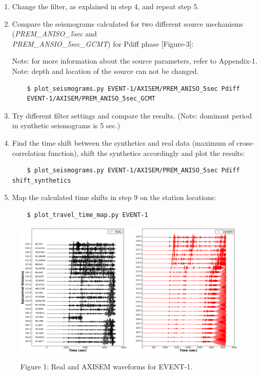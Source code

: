 \documentclass{article}
\begin{document}
\begin{enumerate}
    \item Change the filter, as explained in step 4, and repeat step 5.

    \item Compare the seismograms calculated for two different source
    mechanisms (\textit{PREM\_ANISO\_5sec} and \\
    \textit{PREM\_ANSIO\_5sec\_GCMT}) for Pdiff phase [Figure-3]:

    Note: for more information about the source parameters, refer to Appendix-1.\\
    Note: depth and location of the source can not be changed.
    \begin{verbatim}
    $ plot_seismograms.py EVENT-1/AXISEM/PREM_ANISO_5sec Pdiff
    EVENT-1/AXISEM/PREM_ANISO_5sec_GCMT
    \end{verbatim}

    \item Try different filter settings and compare the results.
    (Note: dominant period in synthetic seismograms is 5 sec.)

    \item Find the time shift between the synthetics and real data (maximum of
    cross-correlation function), shift the synthetics accordingly and plot the results:

    \begin{verbatim}
    $ plot_seismograms.py EVENT-1/AXISEM/PREM_ANISO_5sec Pdiff shift_synthetics
    \end{verbatim}

    \item Map the calculated time shifts in step 9 on the station locations:

    \begin{verbatim}
    $ plot_travel_time_map.py EVENT-1
    \end{verbatim}

\end{enumerate}

\newpage
\begin{figure}[H]
    \centering
    \includegraphics[width=1.\linewidth]{AXISEMTutorial-fig007.png}
    \begin{center}
    {\small{}Figure 1: Real and AXISEM waveforms for EVENT-1.}
    \end{center}
\end{figure}
\end{document}
